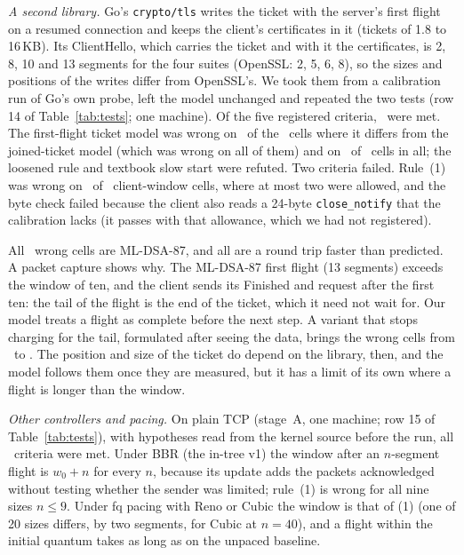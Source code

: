\documentclass[sigconf,9pt,nonacm]{acmart}
\begin{document}
\emph{A second library.} Go's \texttt{crypto/tls} writes the ticket with the server's first flight on a resumed connection and keeps the client's certificates in it (tickets of 1.8 to 16\,KB). Its ClientHello, which carries the ticket and with it the certificates, is 2, 8, 10 and 13 segments for the four suites (OpenSSL: 2, 5, 6, 8), so the sizes and positions of the writes differ from OpenSSL's. We took them from a calibration run of Go's own probe, left the model unchanged and repeated the two tests (row 14 of Table~\ref{tab:tests}; one machine). Of the five registered criteria, \GoMet\ were met. The first-flight ticket model was wrong on \GoDisGoWrong\ of the \GoDisN\ cells where it differs from the joined-ticket model (which was wrong on all of them) and on \GoWrongAll\ of \GoDN\ cells in all; the loosened rule and textbook slow start were refuted. Two criteria failed. Rule~(1) was wrong on \GoCWrong\ of \GoCN\ client-window cells, where at most two were allowed, and the byte check failed because the client also reads a 24-byte \texttt{close\_notify} that the calibration lacks (it passes with that allowance, which we had not registered).

All \GoWrongSuiteN\ wrong cells are ML-DSA-87, and all are a round trip faster than predicted. A packet capture shows why. The ML-DSA-87 first flight (13 segments) exceeds the window of ten, and the client sends its Finished and request after the first ten: the tail of the flight is the end of the ticket, which it need not wait for. Our model treats a flight as complete before the next step. A variant that stops charging for the tail, formulated after seeing the data, brings the wrong cells from \GoPostBefore\ to \GoPostAfter. The position and size of the ticket do depend on the library, then, and the model follows them once they are measured, but it has a limit of its own where a flight is longer than the window.

\emph{Other controllers and pacing.} On plain TCP (stage~A, one machine; row 15 of Table~\ref{tab:tests}), with hypotheses read from the kernel source before the run, all \GelevenN\ criteria were met. Under BBR (the in-tree v1) the window after an $n$-segment flight is $w_0+n$ for every $n$, because its update adds the packets acknowledged without testing whether the sender was limited; rule~(1) is wrong for all nine sizes $n\le9$. Under fq pacing with Reno or Cubic the window is that of (1) (one of 20 sizes differs, by two segments, for Cubic at $n=40$), and a flight within the initial quantum takes as long as on the unpaced baseline.
\end{document}
